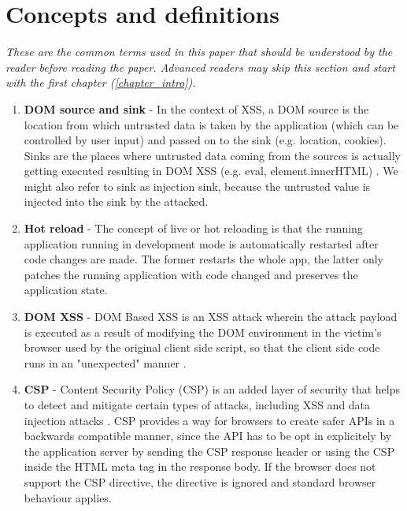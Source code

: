 \chapter*{Concepts and definitions} %
\label{definitions}

\textit{These are the common terms used in this paper that should be understood by the reader before
  reading the paper. Advanced readers may skip this section and start with the first chapter
  (\ref{chapter_intro}).}

\begin{enumerate}
  \item \label{def:dom_source_sink} \textbf{DOM source and sink} - In the context of XSS, a DOM
        source is the location from which untrusted data is taken by the application (which can be
        controlled by user input) and passed on to the sink (e.g. location, cookies). Sinks are the
        places where untrusted data coming from the sources is actually getting executed resulting
        in DOM XSS (e.g. eval, element.innerHTML) \cite{source_sink_definition}. We might also refer
        to sink as injection sink, because the untrusted value is injected into the sink by the
        attacked.
  \item \label{def:hot_reload} \textbf{Hot reload} - The concept of live or hot reloading is that
        the running application running in development mode is automatically restarted after code
        changes are made. The former restarts the whole app, the latter only patches the running
        application with code changed and preserves the application state.
  \item \label{def:dom_xss} \textbf{DOM XSS} - DOM Based XSS is an XSS attack wherein the attack
        payload is executed as a result of modifying the DOM environment in the victim's browser
        used by the original client side script, so that the client side code runs in an
        "unexpected" manner \cite{owasp_dom_xss_def}.
  \item \label{def:csp} \textbf{CSP} - Content Security Policy (CSP) is an added layer of security
        that helps to detect and mitigate certain types of attacks, including XSS and data injection
        attacks \cite{mdn_csp_def}. CSP provides a way for browsers to create safer APIs in a
        backwards compatible manner, since the API has to be opt in explicitely by the application
        server by sending the CSP response header or using the CSP inside the HTML meta tag in the
        response body. If the browser does not support the CSP directive, the directive is ignored
        and standard browser behaviour applies.
\end{enumerate}
